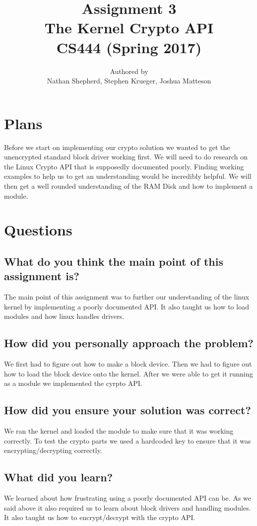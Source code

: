 \documentclass[letterpaper,10pt,titlepage, onecolumn, compsoc]{IEEEtran}
\title{Assignment 3 \\The Kernel Crypto API \\ \vspace{2mm}\small CS444 (Spring 2017)}
\author{Authored by \\ Nathan Shepherd, Stephen Krueger, Joshua Matteson }
\begin{document}
\maketitle
\newpage


\section{Plans}

Before we start on implementing our crypto solution we wanted to get the unencrypted standard block driver working first. We will need to do research on the Linux Crypto API that is supposedly documented poorly. Finding working examples to help us to get an understanding would be incredibly helpful. We will then get a well rounded understanding of the RAM Disk and how to implement a module. 



\section{Questions}

\subsection{What do you think the main point of this assignment is?}
The main point of this assignment was to further our understanding of the linux kernel by implementing a poorly documented API. It also taught us how to load modules and how linux handles drivers. 

\subsection{How did you personally approach the problem?}
We first had to figure out how to make a block device. Then we had to figure out how to load the block device onto the kernel. After we were able to get it running as a module we implemented the cyrpto API. 


\subsection{How did you ensure your solution was correct?}
We ran the kernel and loaded the module to make sure that it was working correctly. To test the crypto parts we used a hardcoded key to ensure that it was encrypting/decrypting correctly. 



\subsection{What did you learn?}
We learned about how frustrating using a poorly documented API can be. As we said above it also required us to learn about block drivers and handling modules. It also taught us how to encrypt/decrypt with the crypto API. 
\end{document}
